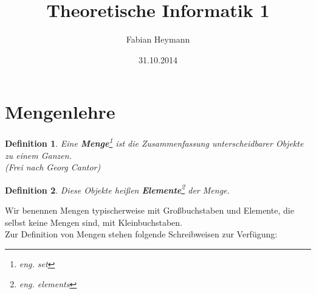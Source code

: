 \documentclass[12pt,german,a4]{article}
\begin{document}
\setlength{\parindent}{0pt}

\def\firstcircle{(0,0) circle (1.5cm)}
\def\smallfirstcircle{(0,0) circle (1cm)}
\def\secondcircle{(0:1cm) circle (1.5cm)}
\def\outercircle{(0:0) circle (2cm)}
\def\smallcircle{(135:2cm) circle (0.5cm)}
\def\smallA{(180:1.5cm) circle (0.5cm)}
\def\smallB{(0:2.5cm) circle (0.5cm)}

\title{Theoretische Informatik 1}
\author{Fabian Heymann}
\date{31.10.2014}
\maketitle

\section{Mengenlehre}

\newtheorem{defSet}{Definition}
\begin{defSet}
Eine {\bf Menge}\footnote{eng. set} ist die Zusammenfassung unterscheidbarer Objekte zu einem Ganzen.\\
(Frei nach Georg Cantor)
\end{defSet}

\newtheorem{defEle}[defSet]{Definition}
\begin{defEle}
Diese Objekte heißen {\bf Elemente}\footnote{eng. elements} der Menge.
\end{defEle}

Wir benennen Mengen typischerweise mit Großbuchstaben und Elemente, die selbst keine Mengen sind, mit Kleinbuchstaben.\\
Zur Definition von Mengen stehen folgende Schreibweisen zur Verfügung:
\end{document}
